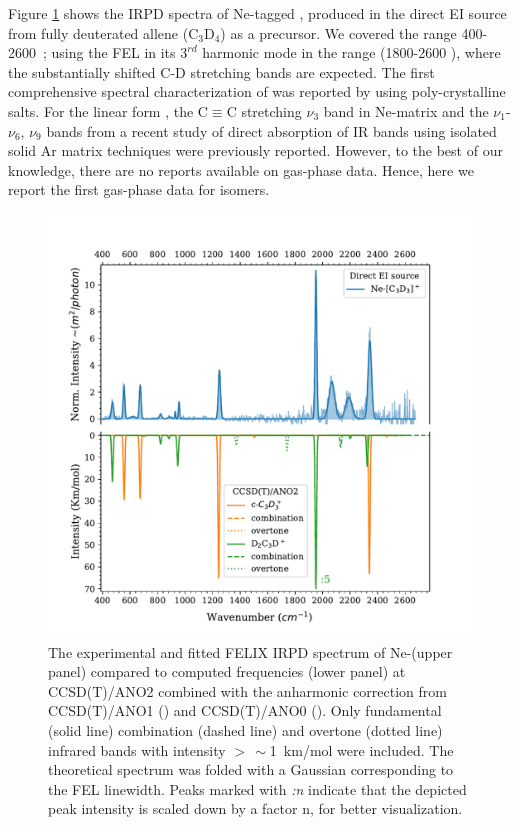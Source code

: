 Figure \ref{FIG:felix_c3d3+} shows the IRPD spectra of Ne-tagged \isoDn, produced in the direct EI source from fully deuterated allene (C$_3$D$_4$) as a precursor. We covered the range 400-2600~\wnn; using the FEL in its $3^{rd}$ harmonic mode in the range (1800-2600 \wnn), where the substantially shifted C-D stretching bands are expected. The first comprehensive spectral characterization of \cycD was reported by \citet{Craig1986} using poly-crystalline salts. For the linear form \linDn, the C$\equiv$C stretching $\nu_3$ band in Ne-matrix \citep{Wyss2001} and the $\nu_1$-$\nu_6$, $\nu_9$ bands from a recent study of direct absorption of IR bands using isolated solid Ar matrix techniques \citep{Chin2018} were previously reported. However, to the best of our knowledge, there are no reports available on gas-phase data. Hence, here we report the first gas-phase data for \isoD isomers.\\ 

\begin{figure}
	\centering
		\includegraphics[scale=.7]{chapters/C3H3+ and C3D3+/figures/felix_c3d3+.pdf}
	\caption{The experimental and fitted FELIX IRPD spectrum of Ne-\isoD (upper panel) compared to computed frequencies (lower panel) at CCSD(T)/ANO2 combined with the anharmonic correction from CCSD(T)/ANO1 (\cycDn) and CCSD(T)/ANO0 (\linDn). Only fundamental (solid line) combination (dashed line) and overtone (dotted line) infrared bands with intensity $>\, \sim$1~km/mol were included. The theoretical spectrum was folded with a Gaussian corresponding to the FEL linewidth. Peaks marked with \textit{:n} indicate that the depicted peak intensity is scaled down by a factor n, for better visualization.}
	\label{FIG:felix_c3d3+}
\end{figure}

